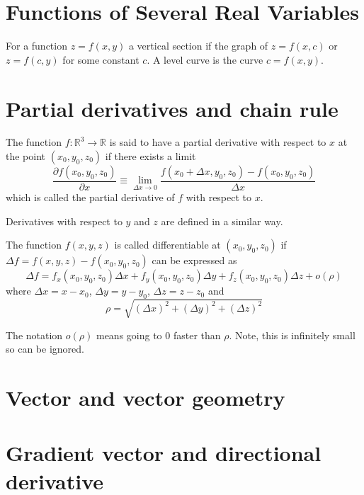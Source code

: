 \documentclass[12pt]{article}
\begin{document}

\tableofcontents
\pagebreak

\section{Functions of Several Real Variables}
	\begin{defn} 
		For a function $z = f(x,y)$ a vertical section if the graph of $z = f(x,c)$ or $z = f(c,y)$ 
		for some constant $c$. A level curve is the curve $c = f(x,y)$.
	\end{defn}

\section{Partial derivatives and chain rule}

	\begin{defn}
		The function $f: \mathbb{R}^3 \to \mathbb{R}$ is said to have a partial derivative with respect to $x$
		at the point $(x_0, y_0, z_0)$ if there exists a limit
			\[
				\frac{\partial f (x_0, y_0, z_0)}{\partial x} \equiv \lim_{\Delta x \to 0} 
				\frac{f(x_0 + \Delta x, y_0, z_0) - f(x_0, y_0, z_0)}{\Delta x}
			\]
		which is called the partial derivative of $f$ with respect to $x$.
	\end{defn}
	
	Derivatives with respect to $y$ and $z$ are defined in a similar way.

	\begin{defn}
		The function $f(x,y,z)$ is called differentiable at $(x_0, y_0, z_0)$ if 
		$\Delta f = f(x,y,z) - f(x_0, y_0, z_0)$ can be expressed as
		\[
			\Delta f = f_x(x_0, y_0, z_0) \Delta x + f_y(x_0, y_0, z_0) \Delta y + f_z(x_0, y_0, z_0) \Delta z + o(\rho)
		\]
		where $\Delta x = x - x_0$, $\Delta y = y - y_0$, $\Delta z = z - z_0$ and 
		\[
			\rho = \sqrt{ (\Delta x)^2 + (\Delta y)^2 + (\Delta z)^2 }
		\]
	\end{defn}
	The notation $o(\rho)$ means going to $0$ faster than $\rho$. Note, this is infinitely small so can be ignored.




\section{Vector and vector geometry}
\section{Gradient vector and directional derivative}
\end{document}
